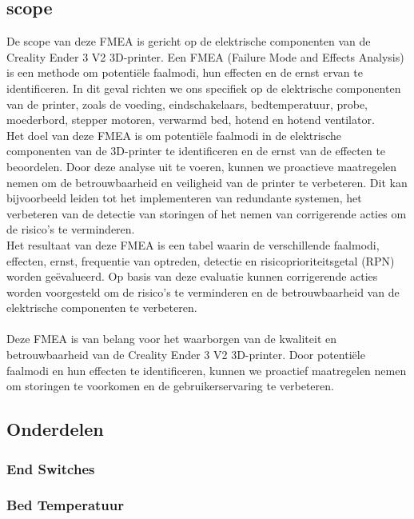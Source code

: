 \setlength{\parindent}{0pt} %
\subsection{scope}
De scope van deze FMEA is gericht op de elektrische componenten van de Creality Ender 3 V2 3D-printer. Een FMEA (Failure Mode and Effects Analysis) is een methode om potentiële faalmodi, hun effecten en de ernst ervan te identificeren. In dit geval richten we ons specifiek op de elektrische componenten van de printer, zoals de voeding, eindschakelaars, bedtemperatuur, probe, moederbord, stepper motoren, verwarmd bed, hotend en hotend ventilator.\\

Het doel van deze FMEA is om potentiële faalmodi in de elektrische componenten van de 3D-printer te identificeren en de ernst van de effecten te beoordelen. Door deze analyse uit te voeren, kunnen we proactieve maatregelen nemen om de betrouwbaarheid en veiligheid van de printer te verbeteren. Dit kan bijvoorbeeld leiden tot het implementeren van redundante systemen, het verbeteren van de detectie van storingen of het nemen van corrigerende acties om de risico's te verminderen.\\

Het resultaat van deze FMEA is een tabel waarin de verschillende faalmodi, effecten, ernst, frequentie van optreden, detectie en risicoprioriteitsgetal (RPN) worden geëvalueerd. Op basis van deze evaluatie kunnen corrigerende acties worden voorgesteld om de risico's te verminderen en de betrouwbaarheid van de elektrische componenten te verbeteren.\\
\\
Deze FMEA is van belang voor het waarborgen van de kwaliteit en betrouwbaarheid van de Creality Ender 3 V2 3D-printer. Door potentiële faalmodi en hun effecten te identificeren, kunnen we proactief maatregelen nemen om storingen te voorkomen en de gebruikerservaring te verbeteren.

\subsection{Onderdelen}
\subsubsection*{End Switches}
\cite{reddit_end_switches}

\subsubsection*{Bed Temperatuur}
\cite{reddit_limit_switches}

